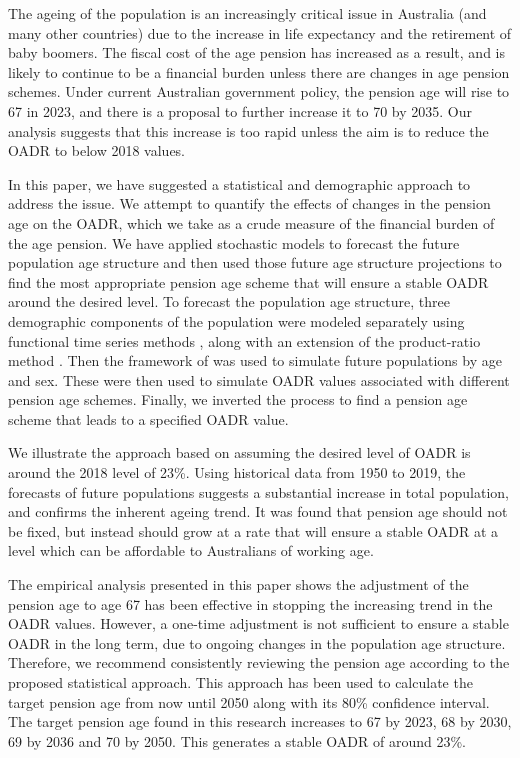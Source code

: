 \documentclass[
  doublespace]{anzsauth}
\begin{document}
The ageing of the population is an increasingly critical issue in Australia (and many other countries) due to the increase in life expectancy and the retirement of baby boomers. The fiscal cost of the age pension has increased as a result, and is likely to continue to be a financial burden unless there are changes in age pension schemes. Under current Australian government policy, the pension age will rise to 67 in 2023, and there is a proposal to further increase it to 70 by 2035. Our analysis suggests that this increase is too rapid unless the aim is to reduce the OADR to below 2018 values.

In this paper, we have suggested a statistical and demographic approach to address the issue. We attempt to quantify the effects of changes in the pension age on the OADR, which we take as a crude measure of the financial burden of the age pension. We have applied stochastic models to forecast the future population age structure and then used those future age structure projections to find the most appropriate pension age scheme that will ensure a stable OADR around the desired level. To forecast the population age structure, three demographic components of the population were modeled separately using functional time series methods \citep{HU07}, along with an extension of the product-ratio method \citep{HBY13}. Then the framework of \citet{HB08} was used to simulate future populations by age and sex. These were then used to simulate OADR values associated with different pension age schemes. Finally, we inverted the process to find a pension age scheme that leads to a specified OADR value.

We illustrate the approach based on assuming the desired level of OADR is around the 2018 level of 23\%. Using historical data from 1950 to 2019, the forecasts of future populations suggests a substantial increase in total population, and confirms the inherent ageing trend. It was found that pension age should not be fixed, but instead should grow at a rate that will ensure a stable OADR at a level which can be affordable to Australians of working age.

The empirical analysis presented in this paper shows the adjustment of the pension age to age 67 has been effective in stopping the increasing trend in the OADR values. However, a one-time adjustment is not sufficient to ensure a stable OADR in the long term, due to ongoing changes in the population age structure. Therefore, we recommend consistently reviewing the pension age according to the proposed statistical approach. This approach has been used to calculate the target pension age from now until 2050 along with its 80\% confidence interval. The target pension age found in this research increases to 67 by 2023, 68 by 2030, 69 by 2036 and 70 by 2050. This generates a stable OADR of around 23\%.
\end{document}
